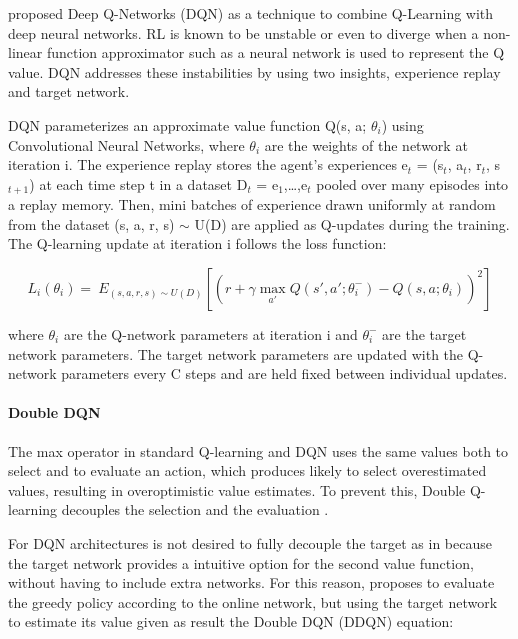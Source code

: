 \documentclass{llncs}
\begin{document}
\cite{Mnih2015} proposed Deep Q-Networks (DQN) as a technique to combine Q-Learning with deep neural networks. RL is known to be unstable or even to diverge when a non-linear function approximator such as a neural network is used to represent the Q value. DQN addresses these instabilities by using two insights, experience replay and target network.
	
	DQN parameterizes an approximate value function Q(s, a; $\theta_{i}$) using Convolutional Neural Networks, where $\theta_{i}$ are the weights of the network at iteration i. The experience replay stores the agent's experiences e$_{t}$ = (s$_{t}$, a$_{t}$, r$_{t}$, s$_{t+1}$) at each time step t in a dataset D$_{t}$ = {e$_{1}$,…,e$_{t}$} pooled over many episodes into a replay memory. Then, mini batches of experience drawn uniformly at random from the dataset (s, a, r, s) $\sim$ U(D) are applied as Q-updates during the training. The Q-learning update at iteration i follows the loss function:
	
\begin{equation}
L_{i}(\theta_{i}) = \ E_{(s,a,r,s) \sim U(D)} \left[ \left(r + \gamma \max_{a'}Q\left(s',a';\theta_{i}^{-}\right) - Q\left(s,a;\theta_{i}\right)\right)^{2} \right]
\end{equation}

where $\theta_{i}$ are the Q-network parameters at iteration i and $\theta_{i}^{-}$ are the target network parameters. The target network parameters are updated with the Q-network parameters every C steps and are held fixed between individual updates.

\paragraph{\textbf{Double DQN}}

	The max operator in standard Q-learning and DQN uses the same values both to select and to evaluate an action, which produces likely to select overestimated values, resulting in overoptimistic value estimates. To prevent this, Double Q-learning decouples the selection and the evaluation \cite{Hasselt2010}.
	
	For DQN architectures is not desired to fully decouple the target as in \cite{Hasselt2010} because the target network provides a intuitive option for the second value function, without having to include extra networks. For this reason, \cite{Hasselt:2016:DRL:3016100.3016191} proposes to evaluate the greedy policy according to the online network, but using the target network to estimate its value given as result the Double DQN (DDQN) equation:
	
\end{document}
